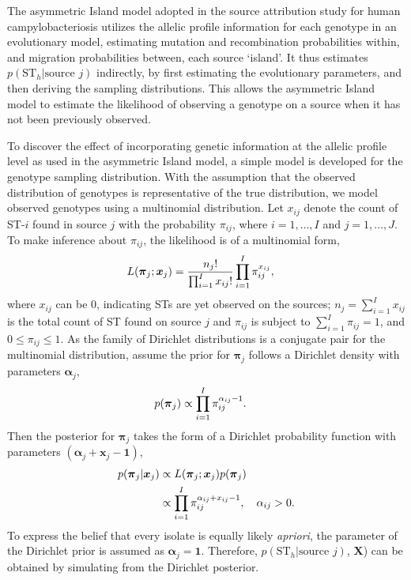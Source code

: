 \documentclass[times, doublespace]{simauth}%
\begin{document}
The asymmetric Island model \cite{Wilso} adopted in the source attribution study for human campylobacteriosis \cite{Marsh} utilizes the allelic profile information for each genotype in an evolutionary model, estimating mutation and recombination probabilities within, and migration probabilities between, each source `island'. It thus estimates $p(\text{ST}_h \vert \text{source }j)$ indirectly, by first estimating the evolutionary parameters, and then deriving the sampling distributions. This allows the asymmetric Island model to estimate the likelihood of observing a genotype on a source when it has not been previously observed.

To discover the effect of incorporating genetic information at the allelic profile level as used in the asymmetric Island model, a simple model is developed for the genotype sampling distribution. With the assumption that the observed distribution of genotypes is representative of the true distribution, we model observed genotypes using a multinomial distribution. Let $x_{ij}$ denote the count of ST-$i$ found in source $j$ with the probability $\pi_{ij}$, where $i=1, \ldots, I$ and $j=1, \ldots, J$. To make inference about $\pi_{ij}$, the likelihood is of a multinomial form,
\begin{align}
        L(\boldsymbol{\pi}_{j} ; \boldsymbol{x}_{j}) & = \frac{n_j!}{\prod_{i=1}^{I} x_{ij}!} \prod_{i=1}^I \pi_{ij}^{x_{ij}}, \notag
\end{align}
where $x_{ij}$ can be $0$, indicating STs are yet observed on the sources; $n_j=\sum_{i=1}^I x_{ij}$ is the total count of ST found on source $j$ and $\pi_{ij}$ is subject to $\sum_{i=1}^I \pi_{ij} =1$, and $0 \leq \pi_{ij} \leq 1$. As the family of Dirichlet distributions is a conjugate pair for the multinomial distribution, assume the prior for $\boldsymbol{\pi}_{j}$ follows a Dirichlet density with parameters $\boldsymbol{\alpha}_{j}$,
\begin{align}
  p(\boldsymbol{\pi}_{j}) & \propto \prod_{i=1}^{I}\pi_{ij}^{\alpha_{ij}-1}. \notag
\end{align}
Then the posterior for $\boldsymbol{\pi}_{j}$ takes the form of a Dirichlet probability function with parameters $(\boldsymbol{\alpha}_{j}+\boldsymbol{x}_{j}-\boldsymbol{1})$,
\begin{align}
        p(\boldsymbol{\pi}_{j} \vert \boldsymbol{x}_{j} ) & \propto L(\boldsymbol{\pi}_{j} ; \boldsymbol{x}_{j}) p(\boldsymbol{\pi}_{j}) \notag \\ 
       & \propto \prod_{i=1}^{I}\pi_{ij}^{\alpha_{ij} + x_{ij}-1}, \quad \alpha_{ij} >0. \notag
 \end{align}
To express the belief that every isolate is equally likely \emph{apriori}, the parameter of the Dirichlet prior is assumed as $\boldsymbol{\alpha}_{j}=\boldsymbol{1}$. Therefore, $p(\text{ST}_h \vert \text{source }j)$, $\boldsymbol{X}$) can be obtained by simulating from the Dirichlet posterior.
\end{document}
